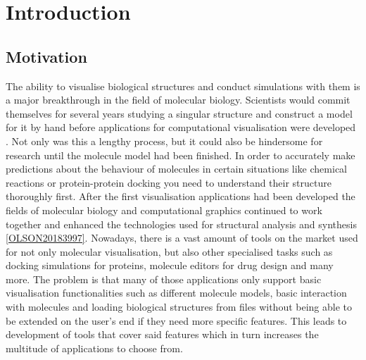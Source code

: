 %
\chapter{Introduction}
\label{sec:intro}

\section{Motivation}
\label{sec:intro:motivation}

The ability to visualise biological structures and conduct simulations with them is a major breakthrough in the field of molecular biology. Scientists would commit themselves for several years studying a singular structure and construct a model for it by hand before applications for computational visualisation were developed \cite{OLSON20183997, 10.1038/nmeth.1427}. Not only was this a lengthy process, but it could also be hindersome for research until the molecule model had been finished. In order to accurately make predictions about the behaviour of molecules in certain situations like chemical reactions or protein-protein docking you need to understand their structure thoroughly first. After the first visualisation applications had been developed the fields of molecular biology and computational graphics continued to work together and enhanced the technologies used for structural analysis and synthesis \ref{OLSON20183997}. Nowadays, there is a vast amount of tools on the market used for not only molecular visualisation, but also other specialised tasks such as docking simulations for proteins, molecule editors for drug design and many more. The problem is that many of those applications only support basic visualisation functionalities such as different molecule models, basic interaction with molecules and loading biological structures from files without being able to be extended on the user's end if they need more specific features. This leads to development of tools that cover said features which in turn increases the multitude of applications to choose from. 

